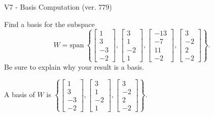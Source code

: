\begin{exercise}
  \begin{exerciseTitle}V7 - Basis Computation (ver. 779)\end{exerciseTitle}
  \begin{exerciseStatement}
    Find a basis for the subspace 
\[W=\mathrm{span}\ \left\{\left[\begin{array}{r}
1 \\
3 \\
-3 \\
-2
\end{array}\right] , \left[\begin{array}{r}
3 \\
1 \\
-2 \\
1
\end{array}\right] , \left[\begin{array}{r}
-13 \\
-7 \\
11 \\
-2
\end{array}\right] , \left[\begin{array}{r}
3 \\
-2 \\
2 \\
-2
\end{array}\right]\right\}.\]
 Be sure to explain why your result is a basis.


  \end{exerciseStatement}
  \begin{exerciseAnswer}
   A basis of \(W\) is  \(\left\{\left[\begin{array}{r}
1 \\
3 \\
-3 \\
-2
\end{array}\right] , \left[\begin{array}{r}
3 \\
1 \\
-2 \\
1
\end{array}\right] , \left[\begin{array}{r}
3 \\
-2 \\
2 \\
-2
\end{array}\right]\right\}\).
  


  \end{exerciseAnswer}
\end{exercise}